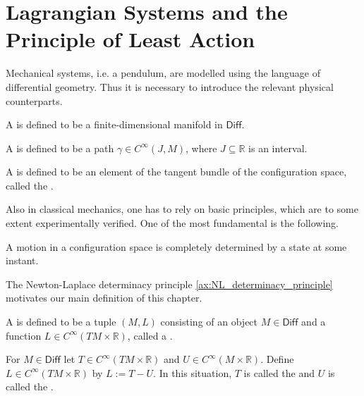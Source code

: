 \section*{Lagrangian Systems and the Principle of Least Action}
Mechanical systems, i.e. a pendulum, are modelled using the language of differential geometry. Thus it is necessary to introduce the relevant physical counterparts. 

\begin{definition}
	A  is defined to be a finite-dimensional manifold in $\mathsf{Diff}$.
\end{definition}

\begin{definition}[Motion]
	A  is defined to be a path $\gamma \in C^\infty(J, M)$, where $J \subseteq \mathbb{R}$ is an interval.
\end{definition}

\begin{definition}[State]
	A  is defined to be an element of the tangent bundle of the configuration space, called the .
\end{definition}

Also in classical mechanics, one has to rely on basic principles, which are to some extent experimentally verified. One of the most fundamental is the following.

\begin{axiom}
	\label{ax:NL_determinacy_principle}
	A motion in a configuration space is completely determined by a state at some instant.
\end{axiom}

The Newton-Laplace determinacy principle \ref{ax:NL_determinacy_principle} motivates our main definition of this chapter.

\begin{definition}
	A  is defined to be a tuple $(M,L)$ consisting of an object $M \in \mathsf{Diff}$ and a function $L \in C^\infty(TM \times \mathbb{R})$, called a .
\end{definition}

\begin{example}
	\label{ex:Lagrangian}
	For $M \in \mathsf{Diff}$ let $T \in C^\infty(TM \times \mathbb{R})$ and $U \in C^\infty(M \times \mathbb{R})$. Define $L \in C^\infty(TM \times \mathbb{R})$ by $L := T - U$. In this situation, $T$ is called the  and $U$ is called the .
\end{example}

